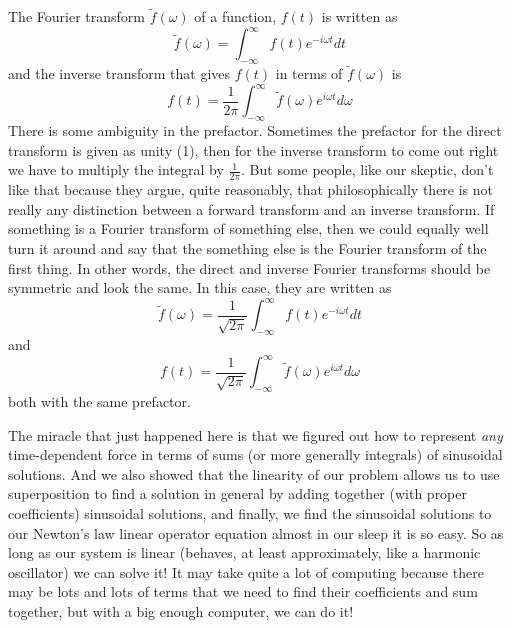 \documentclass[]{revtex4}
\newcommand{\st}[1]{{\color{red}\bfseries #1}}
\begin{document}
The Fourier transform $\tilde{f}(\omega)$ of a function, $f(t)$ is written as
\st{
  \begin{equation}
    \widetilde{f}(\omega) = \int_{-\infty}^{\infty} f(t) e^{-i\omega t} dt
  \end{equation}
}
and the inverse transform that gives  $f(t)$ in terms of  $\tilde{f}(\omega)$ is
\st{
  \begin{equation}
    f(t) = \frac{1}{2\pi} \int_{-\infty}^{\infty} \widetilde{f}(\omega) e^{i\omega t} d\omega
  \end{equation}
}
There is some ambiguity in the prefactor.  Sometimes the prefactor for the direct transform
is given as unity (1), then for the inverse transform to come out right we have to multiply
the integral by $\frac{1}{2\pi}$.  But some people, like our skeptic, don't like that
because they argue, quite reasonably, that philosophically there is not really any
distinction between a forward transform and an inverse transform.  If something is a Fourier
transform of something else, then we could equally well turn it around and say that the
something else is the Fourier transform of the first thing.  In other words, the direct and
inverse Fourier transforms should be symmetric and look the same.  In this case, they are
written as
\st{
  \begin{equation}
    \widetilde{f}(\omega) = \frac{1}{\sqrt{2\pi}} \int_{-\infty}^{\infty} f(t) e^{-i\omega t} dt
  \end{equation}
}
and
\st{
  \begin{equation}
    f(t) = \frac{1}{\sqrt{2\pi}} \int_{-\infty}^{\infty} \widetilde{f}(\omega) e^{i\omega t} d\omega
  \end{equation}
}
both with the same prefactor.

The miracle that just happened here is that we figured out how to represent {\it any}
time-dependent force in terms of sums (or more generally integrals) of sinusoidal solutions.
And we also showed that the linearity of our problem allows us to use superposition to find
a solution in general by adding together (with proper coefficients) sinusoidal solutions,
and finally, we find the sinusoidal solutions to our Newton's law linear operator equation
almost in our sleep it is so easy.  So as long as our system is linear (behaves, at least
approximately, like a harmonic oscillator) we can solve it!  It may take quite a lot of
computing because there may be lots and lots of terms that we need to find their
coefficients and sum together, but with a big enough computer, we can do it!
\end{document}
